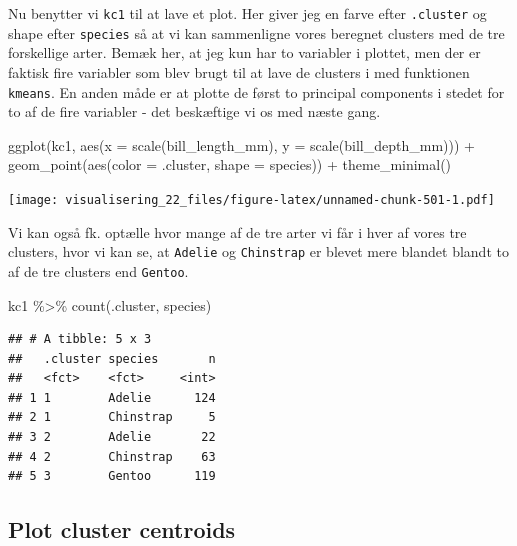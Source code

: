 \documentclass[
]{book}
\newenvironment{Shaded}{\begin{snugshade}}{\end{snugshade}}
\newcommand{\AttributeTok}[1]{\textcolor[rgb]{0.77,0.63,0.00}{#1}}
\newcommand{\FunctionTok}[1]{\textcolor[rgb]{0.00,0.00,0.00}{#1}}
\newcommand{\NormalTok}[1]{#1}
\newcommand{\SpecialCharTok}[1]{\textcolor[rgb]{0.00,0.00,0.00}{#1}}
\begin{document}
Nu benytter vi \texttt{kc1} til at lave et plot. Her giver jeg en farve efter \texttt{.cluster} og shape efter \texttt{species} så at vi kan sammenligne vores beregnet clusters med de tre forskellige arter. Bemæk her, at jeg kun har to variabler i plottet, men der er faktisk fire variabler som blev brugt til at lave de clusters i med funktionen \texttt{kmeans}. En anden måde er at plotte de først to principal components i stedet for to af de fire variabler - det beskæftige vi os med næste gang.

\begin{Shaded}
\begin{Highlighting}[]
\FunctionTok{ggplot}\NormalTok{(kc1, }\FunctionTok{aes}\NormalTok{(}\AttributeTok{x =} \FunctionTok{scale}\NormalTok{(bill\_length\_mm), }
                \AttributeTok{y =} \FunctionTok{scale}\NormalTok{(bill\_depth\_mm))) }\SpecialCharTok{+} 
  \FunctionTok{geom\_point}\NormalTok{(}\FunctionTok{aes}\NormalTok{(}\AttributeTok{color =}\NormalTok{ .cluster, }\AttributeTok{shape =}\NormalTok{ species)) }\SpecialCharTok{+} \FunctionTok{theme\_minimal}\NormalTok{()}
\end{Highlighting}
\end{Shaded}

\texttt{[image: visualisering\_22\_files/figure-latex/unnamed-chunk-501-1.pdf]}

Vi kan også fk. optælle hvor mange af de tre arter vi får i hver af vores tre clusters, hvor vi kan se, at \texttt{Adelie} og \texttt{Chinstrap} er blevet mere blandet blandt to af de tre clusters end \texttt{Gentoo}.

\begin{Shaded}
\begin{Highlighting}[]
\NormalTok{kc1 }\SpecialCharTok{\%\textgreater{}\%} \FunctionTok{count}\NormalTok{(.cluster, species)}
\end{Highlighting}
\end{Shaded}

\begin{verbatim}
## # A tibble: 5 x 3
##   .cluster species       n
##   <fct>    <fct>     <int>
## 1 1        Adelie      124
## 2 1        Chinstrap     5
## 3 2        Adelie       22
## 4 2        Chinstrap    63
## 5 3        Gentoo      119
\end{verbatim}

\hypertarget{plotcentroids}{%
\subsection{Plot cluster centroids}\label{plotcentroids}}
\end{document}
